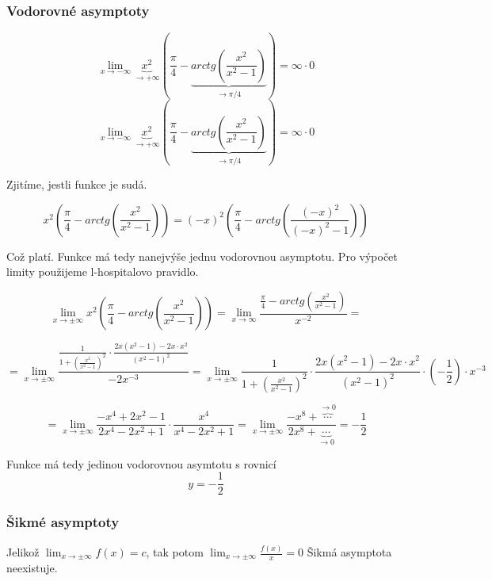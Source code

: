 \subsubsection{Vodorovné asymptoty}


\begin{displaymath}
\lim_{x \to - \infty}\underbrace{x^2}_{\rightarrow+\infty}(\frac{\pi}{4}-\underbrace{arctg(\frac{x^2}{x^2-1})}_{\rightarrow \pi/4}) = \infty \cdot 0
\end{displaymath}
\begin{displaymath}
\lim_{x \to - \infty}\underbrace{x^2}_{\rightarrow+\infty}(\frac{\pi}{4}-\underbrace{arctg(\frac{x^2}{x^2-1})}_{\rightarrow \pi/4}) = \infty \cdot 0
\end{displaymath}


Zjitíme, jestli funkce je sudá.

\begin{displaymath}
x^2(\frac{\pi}{4}-arctg(\frac{x^2}{x^2-1})) = 
(-x)^2(\frac{\pi}{4}-arctg(\frac{(-x)^2}{(-x)^2-1}))
\end{displaymath}

Což platí. Funkce má tedy nanejvýše jednu vodorovnou asymptotu. Pro výpočet limity použijeme l-hospitalovo pravidlo.

\begin{displaymath}
\lim_{x \to \pm \infty}x^2(\frac{\pi}{4}-arctg(\frac{x^2}{x^2-1})) = \lim_{x \to \infty}\frac{\frac{\pi}{4}-arctg(\frac{x^2}{x^2-1})}{x^{-2}} =
\end{displaymath}

\begin{displaymath}
= \lim_{x \to \pm \infty} \frac{\frac{1}{1+(\frac{x^2}{x^2-1})^2}\cdot\frac{2x(x^2-1)-2x\cdot x^2}{(x^2-1)^2}}{-2x^{-3}} = \lim_{x \to \pm \infty}\frac{1}{1+(\frac{x^2}{x^2-1})^2}\cdot\frac{2x(x^2-1)-2x\cdot x^2}{(x^2-1)^2} \cdot (-\frac{1}{2}) \cdot x^{-3} 
\end{displaymath}


\begin{displaymath}
= \lim_{x \to \pm \infty} \frac{-x^4+2x^2-1}{2x^4-2x^2+1} \cdot \frac{x^4}{x^4-2x^2+1} = \lim_{x \to \pm \infty} \frac {-x^8+ \overbrace{\cdots}^{\rightarrow0}}{2x^8 +\underbrace{\cdots}_{\rightarrow0} } = -\frac{1}{2}
\end{displaymath}

Funkce má tedy jedinou vodorovnou asymtotu s rovnicí
\begin{displaymath}
y = - \frac{1}{2}
\end{displaymath}

\subsubsection{Šikmé asymptoty}

Jelikož $\lim_{x \to \pm \infty} f(x) = c$, tak potom $\lim_{x \to \pm \infty} \frac{f(x)}{x} = 0$ Šikmá asymptota neexistuje. 

